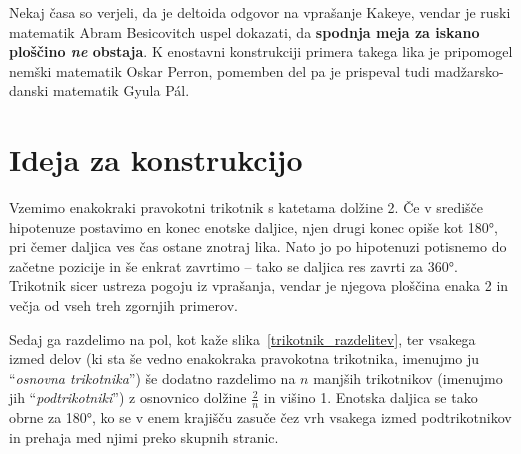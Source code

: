 \documentclass[a4paper, 12pt]{article}
\begin{document}
Nekaj časa so verjeli, da je deltoida odgovor na vprašanje Kakeye, vendar je ruski matematik Abram Besicovitch uspel dokazati, da \textbf{spodnja meja za iskano ploščino \emph{ne} obstaja}. K enostavni konstrukciji primera takega lika je pripomogel nemški matematik Oskar Perron, pomemben del pa je prispeval tudi madžarsko-danski matematik Gyula Pál.


\section*{Ideja za konstrukcijo}

Vzemimo enakokraki pravokotni trikotnik s katetama dolžine 2. Če v središče hipotenuze postavimo en konec enotske daljice, njen drugi konec opiše kot 180°, pri čemer daljica ves čas ostane znotraj lika. Nato jo po hipotenuzi potisnemo do začetne pozicije in še enkrat zavrtimo -- tako se daljica res zavrti za 360°. Trikotnik sicer ustreza pogoju iz vprašanja, vendar je njegova ploščina enaka 2 in večja od vseh treh zgornjih primerov.

Sedaj ga razdelimo na pol, kot kaže slika~\ref{trikotnik_razdelitev}, ter vsakega izmed delov (ki sta še vedno enakokraka pravokotna trikotnika, imenujmo ju ``\emph{osnovna trikotnika}'') še dodatno razdelimo na $ n $ manjših trikotnikov (imenujmo jih ``\emph{podtrikotniki}'') z osnovnico dolžine $ \frac{2}{n} $ in višino 1. Enotska daljica se tako obrne za 180°, ko se v enem krajišču zasuče čez vrh vsakega izmed podtrikotnikov in prehaja med njimi preko skupnih stranic.
\end{document}
